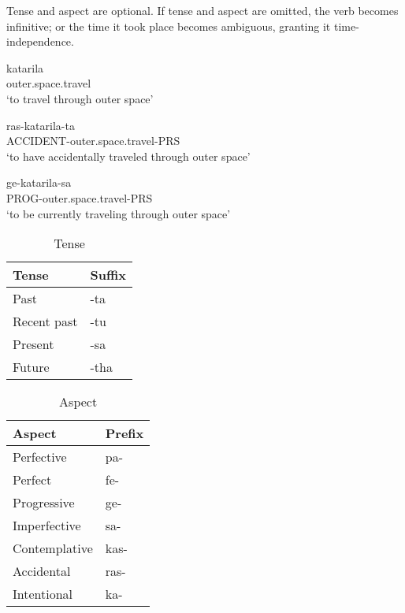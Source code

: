Tense and aspect are optional.
If tense and aspect are omitted, the verb becomes infinitive; or the time
it took place becomes ambiguous, granting it time-independence.

\begin{exe}
    \ex{} \gll{}katarila\\
    outer.space.travel\\
    \glt{}`to travel through outer space'
\end{exe}

\begin{exe}
    \ex{} \gll{}ras-katarila-ta\\
    ACCIDENT-outer.space.travel-PRS\\
    \glt{}`to have accidentally traveled through outer space'
\end{exe}

\begin{exe}
    \ex{} \gll{}ge-katarila-sa\\
    PROG-outer.space.travel-PRS\\
    \glt{}`to be currently traveling through outer space'
\end{exe}

\begin{table}[h!]
    \centering
    \caption{Tense}
    \begin{tabularx}{8cm}{|X|X|}
        \hline
        \textbf{Tense} & \textbf{Suffix} \\
        \hline
        Past & -ta \\
        Recent past & -tu \\
        Present & -sa \\
        Future & -tha \\
        \hline
    \end{tabularx}
\end{table}

\begin{table}[h!]
    \centering
    \caption{Aspect}
    \begin{tabularx}{8cm}{|X|X|}
        \hline
        \textbf{Aspect} & \textbf{Prefix} \\
        \hline
        Perfective & pa- \\
        Perfect & fe- \\
        Progressive & ge- \\
        Imperfective & sa- \\
        Contemplative & kas- \\
        Accidental & ras- \\
        Intentional & ka- \\
        \hline
    \end{tabularx}
\end{table}


